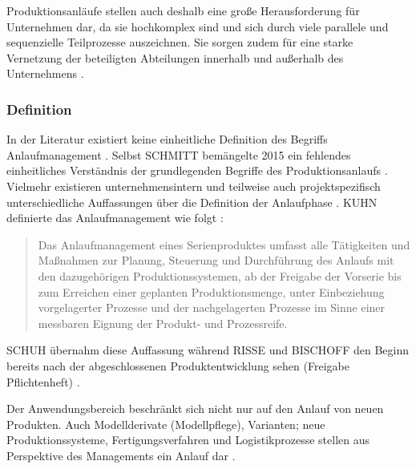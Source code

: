 Produktionsanläufe stellen auch deshalb eine große Herausforderung für Unternehmen dar, da sie hochkomplex sind und sich durch viele parallele und sequenzielle Teilprozesse auszeichnen. Sie sorgen zudem für eine starke Vernetzung der beteiligten Abteilungen innerhalb und außerhalb des Unternehmens \cite{Schuh2004}.


\subsubsection*{Definition}
In der Literatur existiert keine einheitliche Definition des Begriffs Anlaufmanagement \cite[4]{Bischoff2007}. Selbst SCHMITT %
bemängelte 2015 ein fehlendes einheitliches Verständnis der grundlegenden Begriffe des Produktionsanlaufs \cite[1]{Schmitt2015}. Vielmehr existieren unternehmensintern und teilweise auch projektspezifisch unterschiedliche Auffassungen über die Definition der Anlaufphase \cite[11]{Grosshenning2005}. KUHN %
definierte das Anlaufmanagement wie folgt \cite[8]{Kuhn2002}: 
\begin{quotation}
Das Anlaufmanagement eines Serienproduktes umfasst alle Tätigkeiten und Maßnahmen zur Planung, Steuerung und Durchführung des Anlaufs mit den dazugehörigen Produktionssystemen, ab der Freigabe der Vorserie bis zum Erreichen einer geplanten Produktionsmenge, unter Einbeziehung vorgelagerter Prozesse und der nachgelagerten Prozesse im Sinne einer messbaren Eignung der Produkt- und Prozessreife.
\end{quotation}
SCHUH übernahm diese Auffassung \cite{Schuh08a} während RISSE und BISCHOFF den Beginn bereits nach der abgeschlossenen Produktentwicklung sehen (Freigabe Pflichtenheft) \cite{Risse2002, Bischoff2007}.

Der Anwendungsbereich beschränkt sich nicht nur auf den Anlauf von neuen Produkten. Auch Modellderivate (Modellpflege), Varianten; neue Produktionssysteme, Fertigungsverfahren und Logistikprozesse stellen aus Perspektive des Managements ein Anlauf dar \cite[6]{Bischoff2007}. %




% 
%  
% 
% 
% 
% 
% 
% 
% 
% 
